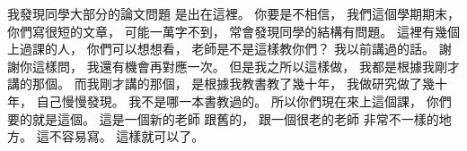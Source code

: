 \hypertarget{w01:cue:2739}{}我發現同學大部分的論文問題
\hypertarget{w01:cue:2740}{}是出在這裡。
\hypertarget{w01:cue:2741}{}你要是不相信，
\hypertarget{w01:cue:2742}{}我們這個學期期末，
\hypertarget{w01:cue:2743}{}你們寫很短的文章，
\hypertarget{w01:cue:2744}{}可能一萬字不到，
\hypertarget{w01:cue:2745}{}常會發現同學的結構有問題。
\hypertarget{w01:cue:2746}{}這裡有幾個上過課的人，
\hypertarget{w01:cue:2747}{}你們可以想想看，
\hypertarget{w01:cue:2748}{}老師是不是這樣教你們？
\hypertarget{w01:cue:2749}{}我以前講過的話。
\hypertarget{w01:cue:2750}{}謝謝你這樣問，
\hypertarget{w01:cue:2751}{}我還有機會再對應一次。
\hypertarget{w01:cue:2752}{}但是我之所以這樣做，
\hypertarget{w01:cue:2753}{}我都是根據我剛才講的那個。
\hypertarget{w01:cue:2754}{}而我剛才講的那個，
\hypertarget{w01:cue:2755}{}是根據我教書教了幾十年，
\hypertarget{w01:cue:2756}{}我做研究做了幾十年，
\hypertarget{w01:cue:2757}{}自己慢慢發現。
\hypertarget{w01:cue:2758}{}我不是哪一本書教過的。
\hypertarget{w01:cue:2759}{}所以你們現在來上這個課，
\hypertarget{w01:cue:2760}{}你們要的就是這個。
\hypertarget{w01:cue:2761}{}這是一個新的老師
\hypertarget{w01:cue:2762}{}跟舊的，
\hypertarget{w01:cue:2763}{}跟一個很老的老師
\hypertarget{w01:cue:2764}{}非常不一樣的地方。
\hypertarget{w01:cue:2765}{}這不容易寫。
\hypertarget{w01:cue:2766}{}這樣就可以了。

